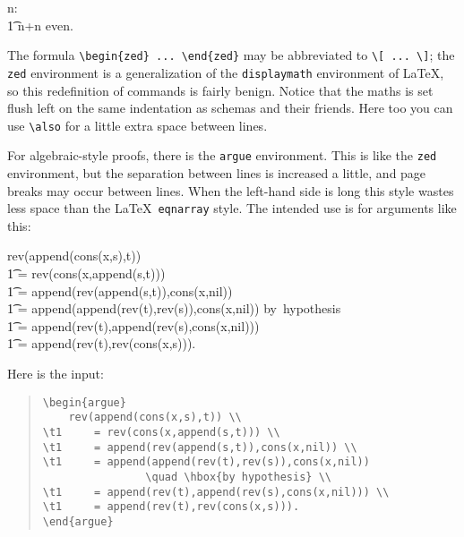 \documentclass[a4paper]{article}
\begin{document}
\vspace{-1ex}\begin{example}
\begin{zed}
    \all n: \nat \dot \\
\t1         n+n \mem even.
\end{zed}
\end{example}

The formula \verb|\begin{zed} ... \end{zed}| may be abbreviated to
\verb|\[ ... \]|; the \verb|zed| environment is a generalization of the
\verb|displaymath| environment of \LaTeX, so this redefinition of
commands is fairly benign. Notice that the maths is set flush left on the
same indentation as schemas and their friends.
Here too you can use \verb|\also| for a little extra space
between lines.

For algebraic-style proofs, there is the \verb|argue| environment.
This is like the \verb|zed| environment, but the separation between
lines is increased a little, and page breaks may occur between lines.
When the left-hand side is long this style wastes less space
than the \LaTeX\ \verb|eqnarray| style.
The intended use is for arguments like this:
\begin{argue}
    rev(append(cons(x,s),t)) \\
\t1     = rev(cons(x,append(s,t))) \\
\t1     = append(rev(append(s,t)),cons(x,nil)) \\
\t1     = append(append(rev(t),rev(s)),cons(x,nil))
                \quad \hbox{by hypothesis} \\
\t1     = append(rev(t),append(rev(s),cons(x,nil))) \\
\t1     = append(rev(t),rev(cons(x,s))).
\end{argue}
Here is the input:
\begin{quote}
\begin{verbatim}
\begin{argue}
    rev(append(cons(x,s),t)) \\
\t1     = rev(cons(x,append(s,t))) \\
\t1     = append(rev(append(s,t)),cons(x,nil)) \\
\t1     = append(append(rev(t),rev(s)),cons(x,nil))
                \quad \hbox{by hypothesis} \\
\t1     = append(rev(t),append(rev(s),cons(x,nil))) \\
\t1     = append(rev(t),rev(cons(x,s))).
\end{argue}
\end{verbatim}
\end{quote}
\end{document}
